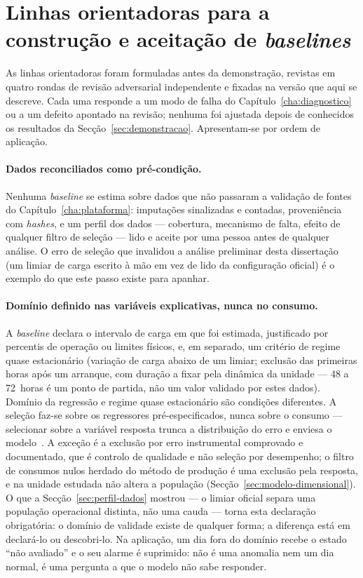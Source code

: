 \section{Linhas orientadoras para a construção e aceitação de \emph{baselines}}
\label{sec:guidelines}

As linhas orientadoras foram formuladas antes da demonstração, revistas em
quatro rondas de revisão adversarial independente
e fixadas na versão que aqui se descreve. Cada uma responde a um modo de
falha do Capítulo~\ref{cha:diagnostico} ou a um defeito apontado na revisão;
nenhuma foi ajustada depois de conhecidos os resultados da
Secção~\ref{sec:demonstracao}. Apresentam-se por ordem de aplicação.

\paragraph{Dados reconciliados como pré-condição.} Nenhuma \emph{baseline} se
estima sobre dados que não passaram a validação de fontes do
Capítulo~\ref{cha:plataforma}: imputações sinalizadas e contadas,
proveniência com \emph{hashes}, e um perfil dos dados --- cobertura,
mecanismo de falta, efeito de qualquer filtro de seleção --- lido e aceite
por uma pessoa antes de qualquer análise. O erro de seleção que invalidou a
análise preliminar desta dissertação (um limiar de carga escrito à mão em vez
de lido da configuração oficial) é o exemplo do que este passo existe para
apanhar.

\paragraph{Domínio definido nas variáveis explicativas, nunca no consumo.} A
\emph{baseline} declara o intervalo de carga em que foi estimada, justificado
por percentis de operação ou limites físicos, e, em separado, um critério de regime
quase estacionário (variação de carga abaixo de um limiar; exclusão das
primeiras horas após um arranque, com duração a fixar pela dinâmica da
unidade --- 48 a 72~horas é um ponto de partida, não um valor validado por
estes dados). Domínio da regressão e regime quase estacionário são condições
diferentes. A seleção faz-se sobre os regressores pré-especificados, nunca
sobre o consumo --- selecionar sobre a variável resposta trunca a
distribuição do erro e enviesa o modelo~\cite{Heckman1979}. A exceção é a
exclusão por erro instrumental comprovado e documentado, que é controlo de
qualidade e não seleção por desempenho; o filtro de consumos nulos herdado
do método de produção é uma exclusão pela resposta, e na unidade estudada
não altera a população (Secção~\ref{sec:modelo-dimensional}). O que a
Secção~\ref{sec:perfil-dados} mostrou --- o limiar oficial separa uma
população operacional distinta, não uma cauda --- torna esta declaração
obrigatória: o domínio de validade existe de qualquer forma; a diferença
está em declará-lo ou descobri-lo. Na aplicação, um dia fora do domínio
recebe o estado ``não avaliado'' e o seu alarme é suprimido: não é uma
anomalia nem um dia normal, é uma pergunta a que o modelo não sabe
responder.


